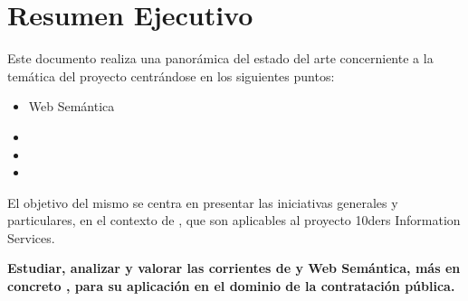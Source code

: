 \chapter*{Resumen Ejecutivo}
\thispagestyle{empty}
Este documento realiza una panorámica del estado del arte concerniente a la temática 
del proyecto centrándose en los siguientes puntos:

\begin{itemize}
 \item Web Semántica
 \item\linkeddata
 \item \opendata
 \item \lod
\end{itemize}

El objetivo del mismo se centra en presentar las iniciativas generales y particulares, en el 
contexto de \eproc, que son aplicables al proyecto 10ders Information Services. 

\begin{Frame}
\textbf{ Estudiar, analizar y valorar las corrientes de \opendata y Web Semántica, más en concreto \linkeddata, para su
aplicación en el dominio de la contratación pública.}
\end{Frame}


